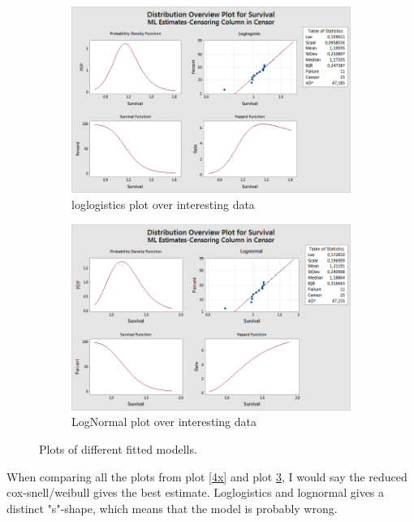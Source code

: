 \documentclass[10pt, a4paper]{article}
\begin{document}
\begin{figure}
         \centering
         \begin{subfigure}[b]{0.5\textwidth}
                 \includegraphics[width=\textwidth]{loglog}
                 \caption{loglogistics plot over interesting data}
                 \label{loglog}
         \end{subfigure}
         \begin{subfigure}[b]{0.5\textwidth}
                 \includegraphics[width=\textwidth]{lognorm}
                 \caption{LogNormal plot over interesting data}
                 \label{lognorm}
         \end{subfigure}

         \caption{Plots of different fitted modells.}\label{2x}
\end{figure}
When comparing all the plots from plot \ref{4x} and plot \ref{2x}, I would say the reduced cox-snell/weibull gives the best estimate. Loglogistics and lognormal gives a distinct "s"-shape, which means that the model is probably wrong.
\end{document}
